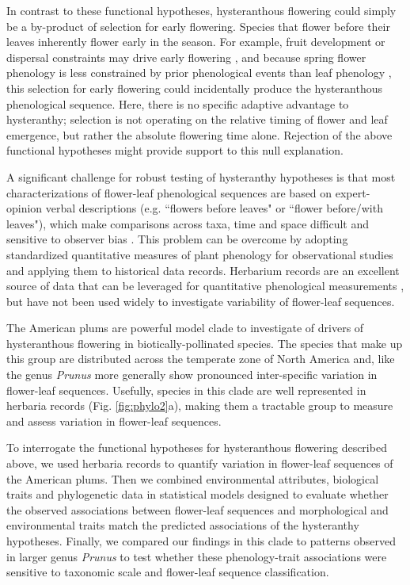 \documentclass{article}[12pt]
\begin{document}
In contrast to these functional hypotheses, hysteranthous flowering could simply be a by-product of selection for early flowering. Species that flower before their leaves inherently flower early in the season. For example, fruit development or dispersal constraints may drive early flowering \citep{Primack1987}, and because spring flower phenology is less constrained by prior phenological events than leaf phenology \citep{Savage2019,Ettinger2018}, this selection for early flowering could incidentally produce the hysteranthous phenological sequence. Here, there is no specific adaptive advantage to hysteranthy;  selection is not operating on the relative timing of flower and leaf emergence, but rather the absolute flowering time alone. Rejection of the above functional hypotheses might provide support to this null explanation. 

\noindent A significant challenge for robust testing of hysteranthy hypotheses is that most characterizations of flower-leaf phenological sequences are based on expert-opinion verbal descriptions (e.g. ``flowers before leaves" or ``flower before/with leaves"), which make comparisons across taxa, time and space difficult and sensitive to observer bias  \citep[see;][]{Buonaiuto2020}. This problem can be overcome by adopting standardized quantitative measures of plant phenology for observational studies and applying them to historical data records. Herbarium records are an excellent source of data that can be leveraged for quantitative phenological measurements \citep{Willis2017}, but have not been used widely to investigate variability of flower-leaf sequences.

\noindent The American plums %
are powerful model clade to investigate of drivers of hysteranthous flowering in biotically-pollinated species. The species that make up this group are distributed across the temperate zone of North America and, like the genus \textit{Prunus} more generally show pronounced inter-specific variation in flower-leaf sequences. Usefully, species in this clade are well represented in herbaria records (Fig. \ref{fig:phylo2}a), making them a tractable group to measure and assess variation in flower-leaf sequences.

\noindent To interrogate the functional hypotheses for hysteranthous flowering described above, we used herbaria records to quantify variation in flower-leaf sequences of the American plums. Then we combined environmental attributes, biological traits and phylogenetic data in statistical models designed to evaluate whether the observed associations between flower-leaf sequences and morphological and environmental traits match the predicted associations of the hysteranthy hypotheses. Finally, we compared our findings in this clade to patterns observed in larger genus \emph{Prunus} to test whether these phenology-trait associations were sensitive to taxonomic scale and flower-leaf sequence classification.
\end{document}
